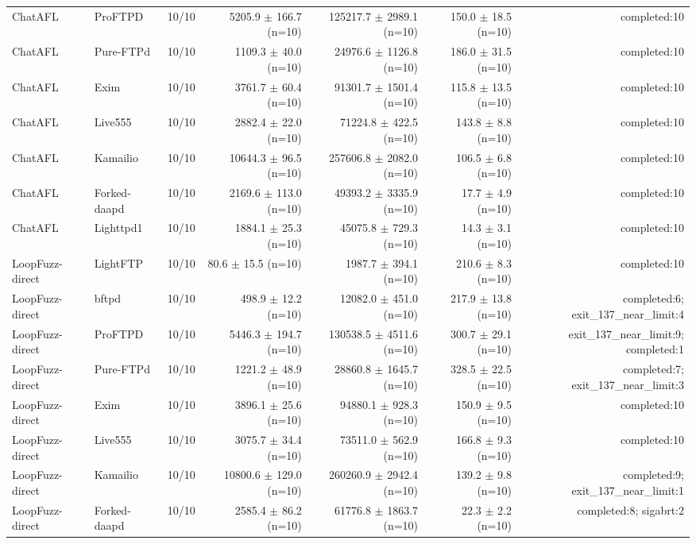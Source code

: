 \begin{table}[t]
{\begin{tabular}{llrrrrr}
ChatAFL & ProFTPD & 10/10 & 5205.9 $\pm$ 166.7 (n=10) & 125217.7 $\pm$ 2989.1 (n=10) & 150.0 $\pm$ 18.5 (n=10) & completed:10 \\
ChatAFL & Pure-FTPd & 10/10 & 1109.3 $\pm$ 40.0 (n=10) & 24976.6 $\pm$ 1126.8 (n=10) & 186.0 $\pm$ 31.5 (n=10) & completed:10 \\
ChatAFL & Exim & 10/10 & 3761.7 $\pm$ 60.4 (n=10) & 91301.7 $\pm$ 1501.4 (n=10) & 115.8 $\pm$ 13.5 (n=10) & completed:10 \\
ChatAFL & Live555 & 10/10 & 2882.4 $\pm$ 22.0 (n=10) & 71224.8 $\pm$ 422.5 (n=10) & 143.8 $\pm$ 8.8 (n=10) & completed:10 \\
ChatAFL & Kamailio & 10/10 & 10644.3 $\pm$ 96.5 (n=10) & 257606.8 $\pm$ 2082.0 (n=10) & 106.5 $\pm$ 6.8 (n=10) & completed:10 \\
ChatAFL & Forked-daapd & 10/10 & 2169.6 $\pm$ 113.0 (n=10) & 49393.2 $\pm$ 3335.9 (n=10) & 17.7 $\pm$ 4.9 (n=10) & completed:10 \\
ChatAFL & Lighttpd1 & 10/10 & 1884.1 $\pm$ 25.3 (n=10) & 45075.8 $\pm$ 729.3 (n=10) & 14.3 $\pm$ 3.1 (n=10) & completed:10 \\
LoopFuzz-direct & LightFTP & 10/10 & 80.6 $\pm$ 15.5 (n=10) & 1987.7 $\pm$ 394.1 (n=10) & 210.6 $\pm$ 8.3 (n=10) & completed:10 \\
LoopFuzz-direct & bftpd & 10/10 & 498.9 $\pm$ 12.2 (n=10) & 12082.0 $\pm$ 451.0 (n=10) & 217.9 $\pm$ 13.8 (n=10) & completed:6; exit\_137\_near\_limit:4 \\
LoopFuzz-direct & ProFTPD & 10/10 & 5446.3 $\pm$ 194.7 (n=10) & 130538.5 $\pm$ 4511.6 (n=10) & 300.7 $\pm$ 29.1 (n=10) & exit\_137\_near\_limit:9; completed:1 \\
LoopFuzz-direct & Pure-FTPd & 10/10 & 1221.2 $\pm$ 48.9 (n=10) & 28860.8 $\pm$ 1645.7 (n=10) & 328.5 $\pm$ 22.5 (n=10) & completed:7; exit\_137\_near\_limit:3 \\
LoopFuzz-direct & Exim & 10/10 & 3896.1 $\pm$ 25.6 (n=10) & 94880.1 $\pm$ 928.3 (n=10) & 150.9 $\pm$ 9.5 (n=10) & completed:10 \\
LoopFuzz-direct & Live555 & 10/10 & 3075.7 $\pm$ 34.4 (n=10) & 73511.0 $\pm$ 562.9 (n=10) & 166.8 $\pm$ 9.3 (n=10) & completed:10 \\
LoopFuzz-direct & Kamailio & 10/10 & 10800.6 $\pm$ 129.0 (n=10) & 260260.9 $\pm$ 2942.4 (n=10) & 139.2 $\pm$ 9.8 (n=10) & completed:9; exit\_137\_near\_limit:1 \\
LoopFuzz-direct & Forked-daapd & 10/10 & 2585.4 $\pm$ 86.2 (n=10) & 61776.8 $\pm$ 1863.7 (n=10) & 22.3 $\pm$ 2.2 (n=10) & completed:8; sigabrt:2 \\

\end{tabular}}
\end{table}
